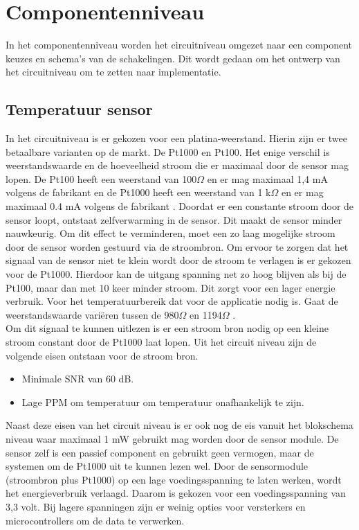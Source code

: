 \newpage
\section{Componentenniveau}
In het componentenniveau worden het circuitniveau omgezet naar een component keuzes en schema's van de schakelingen. Dit wordt gedaan om het ontwerp van het circuitniveau om te zetten naar implementatie. 

\subsection{Temperatuur sensor}
In het circuitniveau is er gekozen voor een platina-weerstand. Hierin zijn er twee betaalbare varianten op de markt. De Pt1000 en Pt100. Het enige verschil is weerstandswaarde en de hoeveelheid stroom die er maximaal door de sensor mag lopen. De Pt100 heeft een weerstand van 100$\Omega$ en er mag maximaal 1,4 mA volgens de fabrikant en de Pt1000 heeft een weerstand van 1 k$\Omega$ en er mag maximaal 0.4 mA volgens de fabrikant \cite{Pt1000}. Doordat er een constante stroom door de sensor loopt, ontstaat zelfverwarming in de sensor. Dit maakt de sensor minder nauwkeurig. Om dit effect te verminderen, moet een zo laag mogelijke stroom door de sensor worden gestuurd via de stroombron. Om ervoor te zorgen dat het signaal van de sensor niet te klein wordt door de stroom te verlagen is er gekozen voor de Pt1000. Hierdoor kan de uitgang spanning net zo hoog blijven als bij de Pt100, maar dan met 10 keer minder stroom. Dit zorgt voor een lager energie verbruik. Voor het temperatuurbereik dat voor de applicatie nodig is. Gaat de weerstandswaarde variëren tussen de 980$\Omega$ en 1194$\Omega$ \cite{measure_tabel}.
\\
\newline
Om dit signaal te kunnen uitlezen is er een stroom bron nodig op een kleine stroom constant door de Pt1000 laat lopen. Uit het circuit niveau zijn de volgende eisen ontstaan voor de stroom bron.
\begin{itemize}
    \item Minimale SNR van 60 dB.
    \item Lage PPM om temperatuur om temperatuur onafhankelijk te zijn.
\end{itemize}
Naast deze eisen van het circuit niveau is er ook nog de eis vanuit het blokschema niveau waar maximaal 1 mW gebruikt mag worden door de sensor module. De sensor zelf is een passief component en gebruikt geen vermogen, maar de systemen om de Pt1000 uit te kunnen lezen wel. Door de sensormodule (stroombron plus Pt1000) op een lage voedingsspanning te laten werken, wordt het energieverbruik verlaagd. Daarom is gekozen voor een voedingsspanning van 3,3 volt. Bij lagere spanningen zijn er weinig opties voor versterkers en microcontrollers om de data te verwerken.
